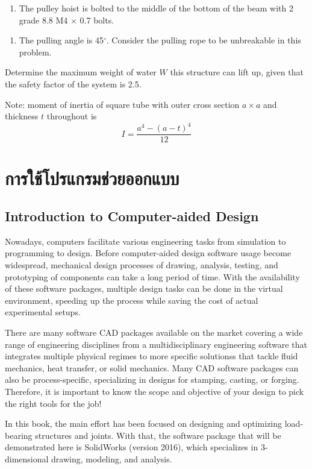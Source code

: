 \documentclass[a4paper,openany,12pt]{book}
\begin{document}
{{\begin{enumerate}
\item The pulley hoist is bolted to the middle of the bottom of the beam
with 2 grade 8.8 M4 \(\times\) 0.7 bolts.
\end{enumerate}


\begin{enumerate}
\item The pulling angle is 45\(^{\circ}\). Consider the pulling rope to be
unbreakable in this problem.
\end{enumerate}

Determine the maximum weight of water \(W\) this structure can lift up,
given that the safety factor of the system is 2.5.

Note: moment of inertia of square tube with outer cross section
\(a \times a\) and thickness \(t\) throughout is
$$I = \frac{a^4 - (a-t)^4}{12}$$

\part{การใช้โปรแกรมช่วยออกแบบ}
\label{the-help}
\chapter{Introduction to Computer-aided Design}
\label{introduction-to-computer-aided-design}
Nowadays, computers facilitate various engineering tasks from simulation
to programming to design. Before computer-aided design software usage
become widespread, mechanical design processes of drawing, analysis,
testing, and prototyping of components can take a long period of time.
With the availability of these software packages, multiple design tasks
can be done in the virtual environment, speeding up the process while
saving the cost of actual experimental setups.

There are many software CAD packages available on the market covering a
wide range of engineering disciplines from a multidisciplinary
engineering software that integrates multiple physical regimes to more
specific solutionss that tackle fluid mechanics, heat transfer, or solid
mechanics. Many CAD software packages can also be process-specific,
specializing in designs for stamping, casting, or forging. Therefore, it
is important to know the scope and objective of your design to pick the
right tools for the job!

In this book, the main effort has been focused on designing and
optimizing load-bearing structures and joints. With that, the software
package that will be demonstrated here is SolidWorks (version 2016),
which specializes in 3-dimensional drawing, modeling, and analysis.

}}
\end{document}
